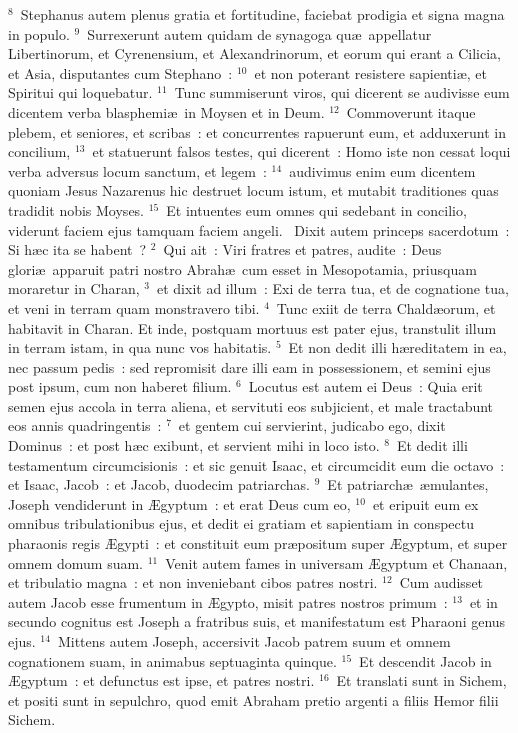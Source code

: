 ${}^{8}$~Stephanus autem plenus gratia et fortitudine, faciebat prodigia et signa magna in populo.
${}^{9}$~Surrexerunt autem quidam de synagoga qu\ae\ appellatur Libertinorum, et Cyrenensium, et Alexandrinorum, et eorum qui erant a Cilicia, et Asia, disputantes cum Stephano~:
${}^{10}$~et non poterant resistere sapienti\ae , et Spiritui qui loquebatur.
${}^{11}$~Tunc summiserunt viros, qui dicerent se audivisse eum dicentem verba blasphemi\ae\ in Moysen et in Deum.
${}^{12}$~Commoverunt itaque plebem, et seniores, et scribas~: et concurrentes rapuerunt eum, et adduxerunt in concilium,
${}^{13}$~et statuerunt falsos testes, qui dicerent~: Homo iste non cessat loqui verba adversus locum sanctum, et legem~:
${}^{14}$~audivimus enim eum dicentem quoniam Jesus Nazarenus hic destruet locum istum, et mutabit traditiones quas tradidit nobis Moyses.
${}^{15}$~Et intuentes eum omnes qui sedebant in concilio, viderunt faciem ejus tamquam faciem angeli.
~Dixit autem princeps sacerdotum~: Si h\ae c ita se habent~?
${}^{2}$~Qui ait~: Viri fratres et patres, audite~: Deus glori\ae\ apparuit patri nostro Abrah\ae\ cum esset in Mesopotamia, priusquam moraretur in Charan,
${}^{3}$~et dixit ad illum~: Exi de terra tua, et de cognatione tua, et veni in terram quam monstravero tibi.
${}^{4}$~Tunc exiit de terra Chald\ae orum, et habitavit in Charan. Et inde, postquam mortuus est pater ejus, transtulit illum in terram istam, in qua nunc vos habitatis.
${}^{5}$~Et non dedit illi h\ae reditatem in ea, nec passum pedis~: sed repromisit dare illi eam in possessionem, et semini ejus post ipsum, cum non haberet filium.
${}^{6}$~Locutus est autem ei Deus~: Quia erit semen ejus accola in terra aliena, et servituti eos subjicient, et male tractabunt eos annis quadringentis~:
${}^{7}$~et gentem cui servierint, judicabo ego, dixit Dominus~: et post h\ae c exibunt, et servient mihi in loco isto.
${}^{8}$~Et dedit illi testamentum circumcisionis~: et sic genuit Isaac, et circumcidit eum die octavo~: et Isaac, Jacob~: et Jacob, duodecim patriarchas.
${}^{9}$~Et patriarch\ae\ \ae mulantes, Joseph vendiderunt in \AE gyptum~: et erat Deus cum eo,
${}^{10}$~et eripuit eum ex omnibus tribulationibus ejus, et dedit ei gratiam et sapientiam in conspectu pharaonis regis \AE gypti~: et constituit eum pr\ae positum super \AE gyptum, et super omnem domum suam.
${}^{11}$~Venit autem fames in universam \AE gyptum et Chanaan, et tribulatio magna~: et non inveniebant cibos patres nostri.
${}^{12}$~Cum audisset autem Jacob esse frumentum in \AE gypto, misit patres nostros primum~:
${}^{13}$~et in secundo cognitus est Joseph a fratribus suis, et manifestatum est Pharaoni genus ejus.
${}^{14}$~Mittens autem Joseph, accersivit Jacob patrem suum et omnem cognationem suam, in animabus septuaginta quinque.
${}^{15}$~Et descendit Jacob in \AE gyptum~: et defunctus est ipse, et patres nostri.
${}^{16}$~Et translati sunt in Sichem, et positi sunt in sepulchro, quod emit Abraham pretio argenti a filiis Hemor filii Sichem.


